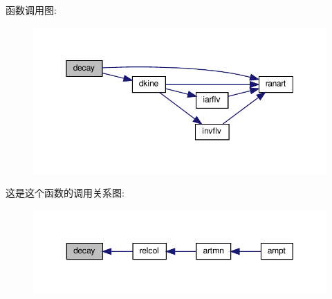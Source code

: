 函数调用图\+:
\nopagebreak
\begin{figure}[H]
\begin{center}
\leavevmode
\includegraphics[width=350pt]{decay_8f90_a0896781f5be84b7c8acc43844e8b1a1b_cgraph}
\end{center}
\end{figure}
这是这个函数的调用关系图\+:
\nopagebreak
\begin{figure}[H]
\begin{center}
\leavevmode
\includegraphics[width=350pt]{decay_8f90_a0896781f5be84b7c8acc43844e8b1a1b_icgraph}
\end{center}
\end{figure}
